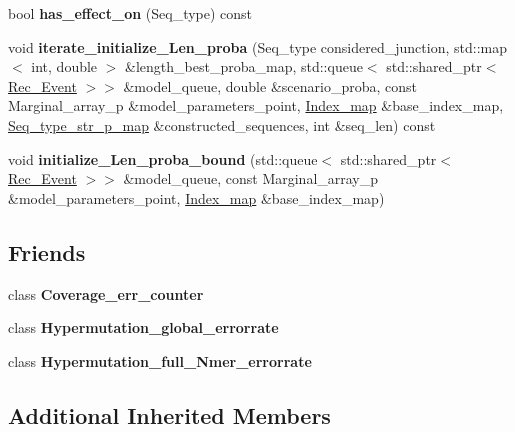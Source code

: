 \begin{DoxyCompactItemize}
\mbox{\label{classDeletion_a497f8a478a3c1065b11741b2bcadca0a}} 
bool {\bfseries has\+\_\+effect\+\_\+on} (Seq\+\_\+type) const
\item 
\mbox{\label{classDeletion_aa28f61f8a3657da735d96ac007d61380}} 
void {\bfseries iterate\+\_\+initialize\+\_\+\+Len\+\_\+proba} (Seq\+\_\+type considered\+\_\+junction, std\+::map$<$ int, double $>$ \&length\+\_\+best\+\_\+proba\+\_\+map, std\+::queue$<$ std\+::shared\+\_\+ptr$<$ \hyperlink{classRec__Event}{Rec\+\_\+\+Event} $>$$>$ \&model\+\_\+queue, double \&scenario\+\_\+proba, const Marginal\+\_\+array\+\_\+p \&model\+\_\+parameters\+\_\+point, \hyperlink{classEnum__fast__memory__map}{Index\+\_\+map} \&base\+\_\+index\+\_\+map, \hyperlink{classEnum__fast__memory__map}{Seq\+\_\+type\+\_\+str\+\_\+p\+\_\+map} \&constructed\+\_\+sequences, int \&seq\+\_\+len) const
\item 
\mbox{\label{classDeletion_a8439fb5c579245ea6038578fcfae0c86}} 
void {\bfseries initialize\+\_\+\+Len\+\_\+proba\+\_\+bound} (std\+::queue$<$ std\+::shared\+\_\+ptr$<$ \hyperlink{classRec__Event}{Rec\+\_\+\+Event} $>$$>$ \&model\+\_\+queue, const Marginal\+\_\+array\+\_\+p \&model\+\_\+parameters\+\_\+point, \hyperlink{classEnum__fast__memory__map}{Index\+\_\+map} \&base\+\_\+index\+\_\+map)
\end{DoxyCompactItemize}
\subsection*{Friends}
\begin{DoxyCompactItemize}
\item 
\mbox{\label{classDeletion_ad4a26da5a0e142c5135c983af6d042d6}} 
class {\bfseries Coverage\+\_\+err\+\_\+counter}
\item 
\mbox{\label{classDeletion_ad5a47907bf54eec60bc584c426aaca7f}} 
class {\bfseries Hypermutation\+\_\+global\+\_\+errorrate}
\item 
\mbox{\label{classDeletion_a5ff5d89d255ca8ca355c6da8c4be7f68}} 
class {\bfseries Hypermutation\+\_\+full\+\_\+\+Nmer\+\_\+errorrate}
\end{DoxyCompactItemize}
\subsection*{Additional Inherited Members}


